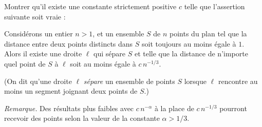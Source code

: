 Montrer qu'il existe une constante strictement positive $c$ telle que
l'assertion suivante soit vraie :

Considérons un entier $n > 1$, et un ensemble $S$ de $n$ points du plan tel
que la distance entre deux points distincts dans $S$ soit toujours au moins
égale à $1$. Alors il existe une droite $\ell$ qui sépare $S$ et telle que la
distance de n'importe quel point de $S$ à $\ell$ soit au moins égale à $c\, n^{-1/3}$.

(On dit qu'une droite $\ell$ \emph{sépare} un ensemble de points $S$ lorsque
$\ell$ rencontre au moins un segment joignant deux points de $S$.)

\medskip
\emph{Remarque.} Des résultats plus faibles avec $c\, n^{-\alpha}$ à la place
de $c\, n^{-1/3}$ pourront recevoir des points selon la valeur de la constante
$\alpha > 1/3$.
